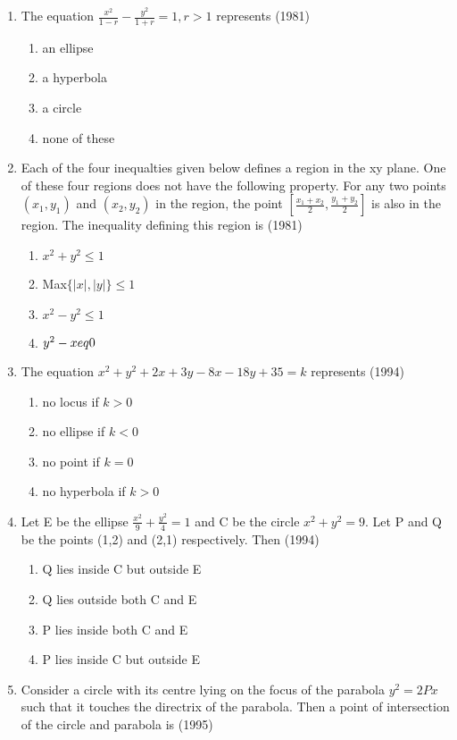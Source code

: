 \documentclass[12pt]{article}
\providecommand{\sbrak}[1]{\ensuremath{{}\left[#1\right]}}
\begin{document}
\begin{enumerate}
\item The equation $\frac{x^2}{1-r}-\frac{y^2}{1+r}=1,r>1$ represents (1981)
\begin{enumerate}
\item an ellipse
\item a hyperbola
\item a circle
\item none of these
\end{enumerate}
\item Each of the four inequalties given below defines a region in the xy plane. One of these four regions does not have the following property. For any two points $(x_1,y_1)$ and $(x_2,y_2)$ in the region, the point $\sbrak{\frac{x_1+x_2}{2},\frac{y_1+y_2}{2}}$ is also in the region. The inequality defining this region is (1981)
\begin{enumerate}
\item $x^2+y^2\leq 1$
\item Max$ \{ \mid x \mid, \mid y \mid \} \leq 1 $
\item $x^2-y^2\leq 1$
\item $y^2-x\\eq 0$
\end{enumerate}
\item The equation $x^2+y^2+2x+3y-8x-18y+35=k$ represents (1994)
\begin{enumerate}
\item no locus if $k>0$
\item no ellipse if $k<0$
\item no point if $k=0$
\item no hyperbola if $k>0$
\end{enumerate}
\item  Let E be the ellipse $\frac{x^2}{9}+\frac{y^2}{4}=1$ and C be the circle $x^2+y^2=9$. Let P and Q be the points (1,2) and (2,1) respectively. Then (1994)
\begin{enumerate}
\item Q lies inside C but outside E
\item Q lies outside both C and E
\item P lies inside both C and E
\item P lies inside C but outside E
\end{enumerate}
\item Consider a circle with its centre lying on the focus of the parabola $y^2=2Px$ such that it touches the directrix of the parabola. Then a point of intersection of the circle and parabola is (1995)

\end{enumerate}
\end{document}
